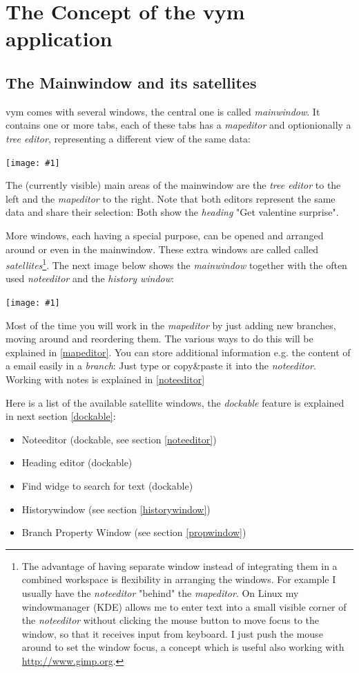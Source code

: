 \documentclass[12pt,a4paper]{article}
\newcommand{\maximage}[1]{  
    \begin{center}
        \texttt{[image: \#1]} 
    \end{center}
}
\newcommand{\vym}{{\sc vym }}
\begin{document}
\section{The Concept of the \vym application}
\subsection{The Mainwindow and its satellites} \label{satellite}
\vym comes with several windows, the central one is called {\em
mainwindow}. It contains one or more
tabs, each of these tabs has a {\em mapeditor} and optionionally a {\em
tree editor}, representing a different view of the same data:
\maximage{images/mainwindow.png}
The (currently visible) main areas of the mainwindow are the {\em tree
editor} to the left and the {\em mapeditor} to the right. Note that both
editors represent the same data and share their selection: Both show the
{\em heading} "Get valentine surprise".

More windows, each having a special purpose, can be opened and arranged
around or even in the mainwindow. These extra windows are called
called {\em satellites}\footnote{
    The advantage of having separate window instead of integrating them
    in a combined workspace is flexibility in arranging the windows. For
    example I usually have the {\em noteeditor} "behind" the {\em
    mapeditor}. On Linux my windowmanager (KDE) allows me to enter text
    into a small visible corner of the {\em noteeditor} without clicking
    the mouse button to move focus to the window, so that it receives
    input from keyboard. I just push the mouse around to set the
    window focus, a concept which is useful also working with 
    \href{http://www.gimp.org}{http://www.gimp.org}.
}. 
The next image below shows the {\em mainwindow}
together with the often used {\em noteeditor} and the {\em history
window}: 
\maximage{images/windows.png}
Most of the time you will work in the {\em mapeditor} by just adding new
branches, moving around and reordering them. The various ways to do this
will be explained in \ref{mapeditor}. You can store additional
information e.g. the content of a email easily in a {\em branch}: Just
type or copy\&paste it into the {\em noteeditor}. Working with notes is
explained in \ref{noteeditor}

Here is a list of the available satellite windows, the {\em dockable}
feature is explained in next section \ref{dockable}:
\begin{itemize}
    \item Noteeditor (dockable, see section \ref {noteeditor})
    \item Heading editor (dockable)
    \item Find widge to search for text (dockable)
    \item Historywindow (see section \ref{historywindow})
    \item Branch Property Window (see section \ref{propwindow})
\end{itemize}
\end{document}
